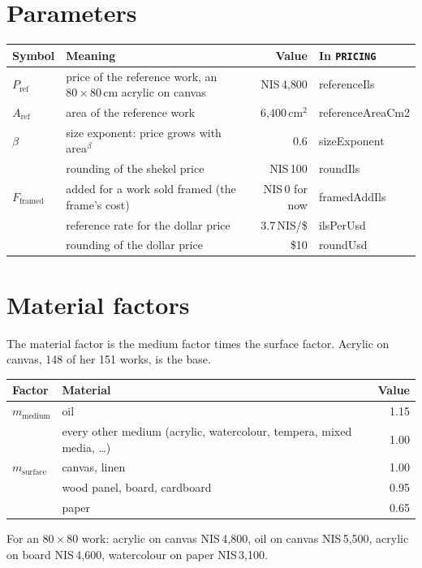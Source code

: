 \documentclass[11pt,a4paper]{article}
\newcommand{\nis}[1]{NIS\,#1}
\newcommand{\code}[1]{\nolinkurl{#1}}  %
\newcommand{\Pref}{P_{\mathrm{ref}}}
\newcommand{\Aref}{A_{\mathrm{ref}}}
\begin{document}
\section{Parameters}
\begin{center}
\small
{}
\begin{tabular}{@{}l>{\raggedright\arraybackslash}p{5.6cm}r>{\ttfamily}l@{}}
  \toprule
  Symbol & Meaning & Value & \normalfont In \code{PRICING} \\
  \midrule
  $\Pref$ & price of the reference work, an $80\times80$\,cm acrylic on canvas & \nis{4{,}800} & referenceIls \\
  $\Aref$ & area of the reference work & 6{,}400\,cm$^2$ & referenceAreaCm2 \\
  $\beta$ & size exponent: price grows with area$^{\beta}$ & 0.6 & sizeExponent \\
  & rounding of the shekel price & \nis{100} & roundIls \\
  $F_{\text{framed}}$ & added for a work sold framed (the frame's cost) & \nis{0} for now & framedAddIls \\
  & reference rate for the dollar price & 3.7\,NIS/\$ & ilsPerUsd \\
  & rounding of the dollar price & \$10 & roundUsd \\
  \bottomrule
\end{tabular}
\end{center}

\section{Material factors}
The material factor is the medium factor times the surface factor. Acrylic on canvas, 148 of her
151 works, is the base.
\begin{center}
\begin{tabular}{@{}llr@{}}
  \toprule
  Factor & Material & Value \\
  \midrule
  $m_{\text{medium}}$ & oil & 1.15 \\
                      & every other medium (acrylic, watercolour, tempera, mixed media, \ldots) & 1.00 \\
  \midrule
  $m_{\text{surface}}$ & canvas, linen & 1.00 \\
                       & wood panel, board, cardboard & 0.95 \\
                       & paper & 0.65 \\
  \bottomrule
\end{tabular}
\end{center}
For an $80\times80$ work: acrylic on canvas \nis{4{,}800}, oil on canvas \nis{5{,}500}, acrylic on
board \nis{4{,}600}, watercolour on paper \nis{3{,}100}.
\end{document}
